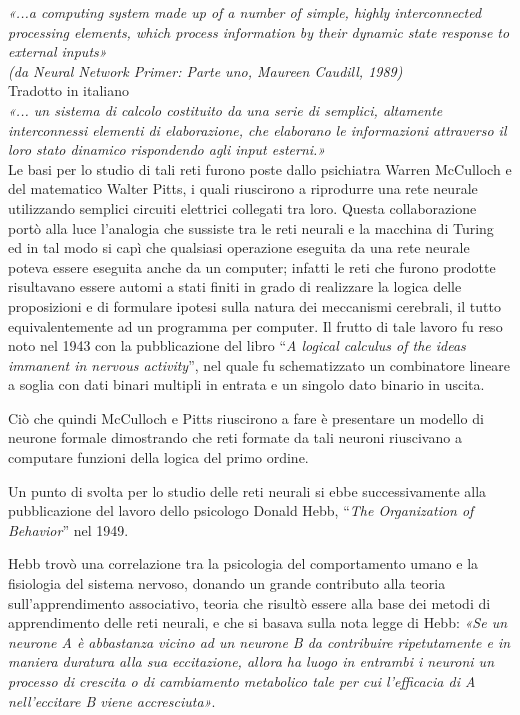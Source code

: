 \documentclass[12pt,a4paper,oneside]{book}
\begin{document}
		\textit{«...a computing system made up of a number of simple, highly interconnected processing elements, which process information by their dynamic state response to external inputs»}\\
		\textit{(da Neural Network Primer: Parte uno, Maureen Caudill, 1989)}\\
		
		Tradotto in italiano \\
		\textit{«... un sistema di calcolo costituito da una serie di semplici, altamente interconnessi elementi di elaborazione, che elaborano le informazioni attraverso il loro stato dinamico rispondendo agli input esterni.»}\\
		
	    Le basi per lo studio di tali reti furono poste dallo psichiatra Warren McCulloch e del matematico Walter Pitts, i quali riuscirono a riprodurre una rete neurale utilizzando semplici circuiti elettrici collegati tra loro. Questa collaborazione portò alla luce l'analogia che sussiste tra le reti neurali e la macchina di Turing ed in tal modo si capì che qualsiasi operazione eseguita da una rete neurale poteva essere eseguita anche da un computer; infatti le reti che furono prodotte risultavano essere automi a stati finiti in grado di realizzare la logica delle proposizioni e di formulare ipotesi sulla natura dei meccanismi cerebrali, il tutto equivalentemente ad un programma per computer.
	    Il frutto di tale lavoro fu reso noto nel 1943 con la pubblicazione del libro ``\emph{A logical calculus of the ideas immanent in nervous activity}'', nel quale fu schematizzato un combinatore lineare a soglia con dati binari multipli in entrata e un singolo dato binario in uscita.
	    
	    Ciò che quindi McCulloch e Pitts riuscirono a fare è presentare un modello di neurone formale dimostrando che reti formate da tali neuroni riuscivano a computare funzioni della logica del primo ordine.
	    
	    Un punto di svolta per lo studio delle reti neurali si ebbe successivamente alla pubblicazione del lavoro dello psicologo Donald Hebb, ``\emph{The Organization of Behavior}'' nel 1949.
	     
	    Hebb trovò una correlazione tra la psicologia del comportamento umano e la fisiologia del sistema nervoso, donando un grande contributo alla teoria sull'apprendimento associativo, teoria che risultò essere alla base dei metodi di apprendimento delle reti neurali, e che si basava sulla nota legge di Hebb: \textit{«Se un neurone A è abbastanza vicino ad un neurone B da contribuire ripetutamente e in maniera duratura alla sua eccitazione, allora ha luogo in entrambi i neuroni un processo di crescita o di cambiamento metabolico tale per cui l'efficacia di A nell'eccitare B viene accresciuta»}.
	    
\end{document}
